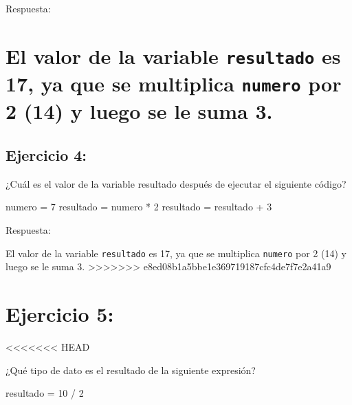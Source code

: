 \documentclass[
  a4paper,
  onepage,
  openany]{scrreprt}
\newenvironment{Shaded}{\begin{snugshade}}{\end{snugshade}}
\newcommand{\DecValTok}[1]{\textcolor[rgb]{0.68,0.00,0.00}{#1}}
\newcommand{\NormalTok}[1]{\textcolor[rgb]{0.00,0.23,0.31}{#1}}
\newcommand{\OperatorTok}[1]{\textcolor[rgb]{0.37,0.37,0.37}{#1}}
\begin{document}
Respuesta:

\hypertarget{el-valor-de-la-variable-resultado-es-17-ya-que-se-multiplica-numero-por-2-14-y-luego-se-le-suma-3.}{%
\chapter{\texorpdfstring{El valor de la variable \texttt{resultado} es
17, ya que se multiplica \texttt{numero} por 2 (14) y luego se le suma
3.}{El valor de la variable resultado es 17, ya que se multiplica numero por 2 (14) y luego se le suma 3.}}\label{el-valor-de-la-variable-resultado-es-17-ya-que-se-multiplica-numero-por-2-14-y-luego-se-le-suma-3.}}

\hypertarget{ejercicio-4-1}{%
\section{Ejercicio 4:}\label{ejercicio-4-1}}

¿Cuál es el valor de la variable resultado después de ejecutar el
siguiente código?

\begin{Shaded}
\begin{Highlighting}[]
\NormalTok{numero }\OperatorTok{=} \DecValTok{7}
\NormalTok{resultado }\OperatorTok{=}\NormalTok{ numero }\OperatorTok{*} \DecValTok{2}
\NormalTok{resultado }\OperatorTok{=}\NormalTok{ resultado }\OperatorTok{+} \DecValTok{3}
\end{Highlighting}
\end{Shaded}

Respuesta:

El valor de la variable \texttt{resultado} es 17, ya que se multiplica
\texttt{numero} por 2 (14) y luego se le suma 3.
\textgreater\textgreater\textgreater\textgreater\textgreater\textgreater\textgreater{}
e8ed08b1a5bbe1e369719187cfc4de7f7e2a41a9

\hypertarget{ejercicio-5}{%
\chapter{Ejercicio 5:}\label{ejercicio-5}}

\textless\textless\textless\textless\textless\textless\textless{} HEAD

¿Qué tipo de dato es el resultado de la siguiente expresión?

\begin{Shaded}
\begin{Highlighting}[]
\NormalTok{resultado }\OperatorTok{=} \DecValTok{10} \OperatorTok{/} \DecValTok{2}
\end{Highlighting}
\end{Shaded}
\end{document}
